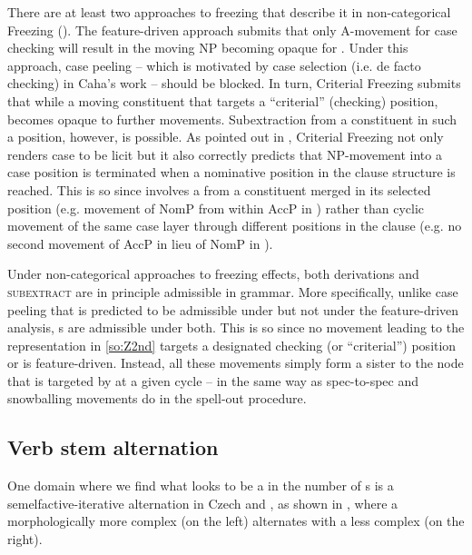 \noindent
There are at least two approaches to freezing that describe it in non-categorical 
Freezing (\citealt{Rizzi2006,Rizzi2007,RizziShlonsky2007}). The feature-driven approach submits that only A-movement for case checking will result in the moving NP becoming opaque for . Under this approach, case peeling -- which is motivated by case selection (i.e. de facto checking) in Caha's work -- should be blocked. In turn, Criterial Freezing submits that while a moving constituent that targets a ``criterial'' (checking) position, becomes opaque to further movements. Subextraction from a constituent in such a position, however, is possible. As pointed out in \citeauthor{Caha2009} \citeyearpar[146--147]{Caha2009}, Criterial Freezing not only renders case  to be licit but it also correctly predicts that NP-movement into a case position is terminated when a nominative position in the clause structure is reached. This is so since  involves a  from a  constituent merged in its selected position (e.g. movement of NomP from within AccP in ) rather than cyclic movement of the same case layer through different positions in the clause (e.g. no second movement of AccP in lieu of NomP in ). 
\par
Under non-categorical approaches to freezing effects, both  derivations and \textsc{subextract} are in principle admissible in grammar.  More specifically, unlike case peeling that is predicted to be admissible under  but not under the feature-driven analysis, s are admissible under both. This is so since no movement leading to the representation in \ref{so:Z2nd} targets a designated checking (or ``criterial'') position or is feature-driven. Instead, all these movements simply form a sister to the node that is targeted by  at a given cycle -- in the same way as spec-to-spec and snowballing movements do in the spell-out procedure.

\subsection{Verb stem alternation}

One domain where we find what looks to be a  in the number of s is a semelfactive-iterative alternation  in Czech and , as shown in \Next, where a morphologically more complex  (on the left) alternates with a less complex  (on the right).

